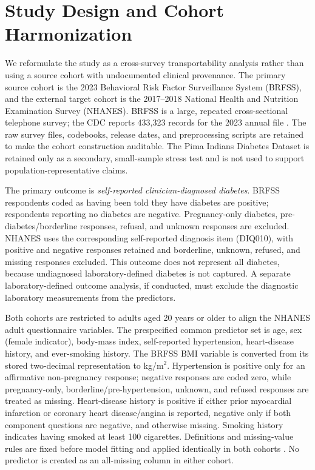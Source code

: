 
\section{Study Design and Cohort Harmonization}
\label{sec:study_design}

We reformulate the study as a cross-survey transportability analysis rather than
using a source cohort with undocumented clinical provenance. The primary source
cohort is the 2023 Behavioral Risk Factor Surveillance System (BRFSS), and the
external target cohort is the 2017--2018 National Health and Nutrition
Examination Survey (NHANES). BRFSS is a large, repeated cross-sectional
telephone survey; the CDC reports 433,323 records for the 2023 annual file \cite{CDC_BRFSS_2023}.
The raw survey files, codebooks, release dates, and preprocessing scripts are
retained to make the cohort construction auditable. The Pima Indians Diabetes
Dataset is retained only as a secondary, small-sample stress test and is not
used to support population-representative claims.

The primary outcome is \emph{self-reported clinician-diagnosed diabetes}.
BRFSS respondents coded as having been told they have diabetes are positive;
respondents reporting no diabetes are negative. Pregnancy-only diabetes,
pre-diabetes/borderline responses, refusal, and unknown responses are excluded.
NHANES uses the corresponding self-reported diagnosis item (DIQ010), with
positive and negative responses retained and borderline, unknown, refused, and
missing responses excluded. This outcome does not represent all diabetes,
because undiagnosed laboratory-defined diabetes is not captured. A separate
laboratory-defined outcome analysis, if conducted, must exclude the diagnostic
laboratory measurements from the predictors.

Both cohorts are restricted to adults aged 20 years or older to align the
NHANES adult questionnaire variables. The prespecified common predictor set is
age, sex (female indicator), body-mass index, self-reported hypertension,
heart-disease history, and ever-smoking history. The BRFSS BMI variable is
converted from its stored two-decimal representation to kg/m$^2$. Hypertension
is positive only for an affirmative non-pregnancy response; negative responses
are coded zero, while pregnancy-only, borderline/pre-hypertension, unknown,
and refused responses are treated as missing. Heart-disease history is positive
if either prior myocardial infarction or coronary heart disease/angina is
reported, negative only if both component questions are negative, and otherwise
missing. Smoking history indicates having smoked at least 100 cigarettes.
Definitions and missing-value rules are fixed before model fitting and applied
identically in both cohorts \cite{CDC_BRFSS_CV_2023,NCHS_NHANES_2017_2018}. No predictor is created as an all-missing column
in either cohort.

